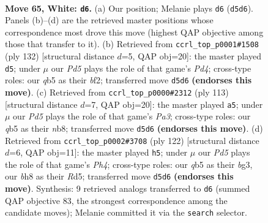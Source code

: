 \documentclass[11pt]{article}
\begin{document}
\clearpage

\begin{figure}[p]\centering
\begin{subfigure}{0.46\textwidth}\centering
\resizebox{\linewidth}{!}{%
\newchessgame
\chessboard[
  setfen={5k1b/5p2/8/1q1P4/8/7K/8/8 w - - 0 65},
  showmover=false,
  pgfstyle=straightmove, color=movearrow, markmove={d5-d6}
]}
\caption{}
\end{subfigure}\hfill
\begin{subfigure}{0.46\textwidth}\centering
\resizebox{\linewidth}{!}{%
\newchessgame
\chessboard[
  setfen={8/8/2B5/7k/1K1P2p1/8/5b2/8 w - - 0 67},
  showmover=false,
  pgfstyle=straightmove, color=movearrow, markmove={d4-d5}
]}
\caption{}
\end{subfigure}
\\[4pt]
\begin{subfigure}{0.46\textwidth}\centering
\resizebox{\linewidth}{!}{%
\newchessgame
\chessboard[
  setfen={1N2k3/8/p7/2PK4/8/8/3b4/8 b - - 2 57},
  showmover=false,
  pgfstyle=straightmove, color=movearrow, markmove={a6-a5}
]}
\caption{}
\end{subfigure}\hfill
\begin{subfigure}{0.46\textwidth}\centering
\resizebox{\linewidth}{!}{%
\newchessgame
\chessboard[
  setfen={6k1/6p1/8/3R4/7P/6b1/8/5K2 w - - 0 62},
  showmover=false,
  pgfstyle=straightmove, color=movearrow, markmove={h4-h5}
]}
\caption{}
\end{subfigure}
\caption{\textbf{Move 65, White: \texttt{d6}.} (a) Our position; Melanie plays \texttt{d6} (\texttt{d5d6}). Panels (b)--(d) are the retrieved master positions whose correspondence most drove this move (highest QAP objective among those that transfer to it). (b) Retrieved from \texttt{ccrl\_top\_p0001\#1508} (ply 132) [structural distance $d$=5, QAP obj=20]: the master played \texttt{d5}; under $\mu$ our \emph{Pd5} plays the role of that game's \emph{Pd4}; cross-type roles: our \emph{q}b5 as their \emph{b}f2; transferred move \texttt{d5d6} \textbf{(endorses this move)}. (c) Retrieved from \texttt{ccrl\_top\_p0000\#2312} (ply 113) [structural distance $d$=7, QAP obj=20]: the master played \texttt{a5}; under $\mu$ our \emph{Pd5} plays the role of that game's \emph{Pa3}; cross-type roles: our \emph{q}b5 as their \emph{n}b8; transferred move \texttt{d5d6} \textbf{(endorses this move)}. (d) Retrieved from \texttt{ccrl\_top\_p0002\#3708} (ply 122) [structural distance $d$=6, QAP obj=11]: the master played \texttt{h5}; under $\mu$ our \emph{Pd5} plays the role of that game's \emph{Ph4}; cross-type roles: our \emph{q}b5 as their \emph{b}g3, our \emph{b}h8 as their \emph{R}d5; transferred move \texttt{d5d6} \textbf{(endorses this move)}. Synthesis: 9 retrieved analogs transferred to \texttt{d6} (summed QAP objective 83, the strongest correspondence among the candidate moves); Melanie committed it via the \texttt{search} selector.}
\label{fig:thought-m128}
\end{figure}
\end{document}
